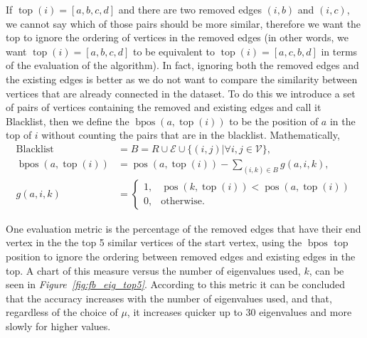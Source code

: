 \documentclass[12pt]{report}
\DeclareMathOperator{\ttop}{top}
\DeclareMathOperator{\bpos}{bpos}
\DeclareMathOperator{\pos}{pos}
\begin{document}
If $\ttop(i) = [a, b, c, d]$ and there are two removed edges $(i, b)$ and $(i, c)$,
we cannot say which of those pairs should be more similar, therefore we want
the top to ignore the ordering of vertices in the removed edges (in other words,
we want $\ttop(i) = [a, b, c, d]$ to be equivalent to $\ttop(i) = [a, c, b, d]$ in
terms of the evaluation of the algorithm). In fact, ignoring both the removed
edges and the existing edges is better as we do not want to compare the
similarity between vertices that are already connected in the dataset. To do
this we introduce a set of pairs of vertices containing the removed and existing
edges and call it Blacklist, then we define the $\bpos(a, \ttop(i))$ to be the
position of $a$ in the top of $i$ without counting the pairs that are in the
blacklist. Mathematically,
\begin{align}
  \text{Blacklist} &= B = R \cup \mathcal{E} \cup \{(i,j) | \forall i, j \in
    \mathcal{V}\}, \\
  \bpos(a, \ttop(i)) &= \pos(a, \ttop(i)) - \sum_{(i, k) \in B} g(a,i,k), \\
  g(a,i,k) &= \left\{ \begin{array}{ll}
    1, & \pos(k, \ttop(i)) < \pos(a, \ttop(i)) \\
    0, & \text{otherwise}.
  \end{array} \right.
\end{align}


One evaluation metric is the percentage of the removed edges that have
their end vertex in the the top 5 similar vertices of the start vertex, using
the $\bpos$ top position to ignore the ordering between removed edges and
existing edges in the top. A chart of this measure versus the number of
eigenvalues used, $k$, can be seen in \emph{Figure~\ref{fig:fb_eig_top5}}.
According to this metric it can be concluded that the accuracy increases with
the number of eigenvalues used, and that, regardless of the choice of $\mu$,
it increases quicker up to 30 eigenvalues and more slowly for higher values.
\end{document}
